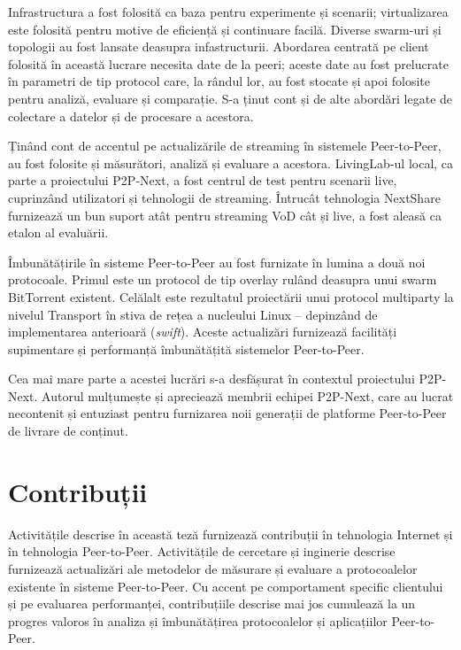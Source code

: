Infrastructura a fost folosită ca baza pentru experimente și scenarii;
virtualizarea este folosită pentru motive de eficiență și continuare facilă.
Diverse swarm-uri și topologii au fost lansate deasupra infastructurii.
Abordarea centrată pe client folosită în această lucrare necesita date de la
peeri; aceste date au fost prelucrate în parametri de tip protocol care, la
rândul lor, au fost stocate și apoi folosite pentru analiză, evaluare și
comparație. S-a ținut cont și de alte abordări legate de colectare a
datelor și de procesare a acestora.

Ținând cont de accentul pe actualizările de streaming în sistemele
Peer-to-Peer, au fost folosite și măsurători, analiză și evaluare a acestora.
LivingLab-ul local, ca parte a proiectului P2P-Next, a fost centrul de test
pentru scenarii live, cuprinzând utilizatori și tehnologii de streaming.
Întrucât tehnologia NextShare furnizează un bun suport atât pentru streaming
VoD cât și live, a fost aleasă ca etalon al evaluării.

Îmbunătățirile în sisteme Peer-to-Peer au fost furnizate în lumina a două noi
protocoale. Primul este un protocol de tip overlay rulând deasupra unui swarm
BitTorrent existent. Celălalt este rezultatul proiectării unui protocol
multiparty la nivelul Transport în stiva de rețea a nucleului Linux --
depinzând de implementarea anterioară (\textit{swift}). Aceste actualizări
furnizează facilități supimentare și performanță îmbunătățită sistemelor
Peer-to-Peer.

Cea mai mare parte a acestei lucrări s-a desfășurat în contextul proiectului
P2P-Next. Autorul mulțumește și apreciează membrii echipei P2P-Next, care au
lucrat necontenit și entuziast pentru furnizarea noii generații de platforme
Peer-to-Peer de livrare de conținut.

\section{Contribuții}
\label{sec:conclusion:contributions}

Activitățile descrise în această teză furnizează contribuții în
tehnologia Internet și în tehnologia Peer-to-Peer. Activitățile de cercetare
și inginerie descrise furnizează actualizări ale metodelor de măsurare și
evaluare a protocoalelor existente în sisteme Peer-to-Peer. Cu accent pe
comportament specific clientului și pe evaluarea performanței, contribuțiile
descrise mai jos cumulează la un progres valoros în analiza și îmbunătățirea
protocoalelor și aplicațiilor Peer-to-Peer.


